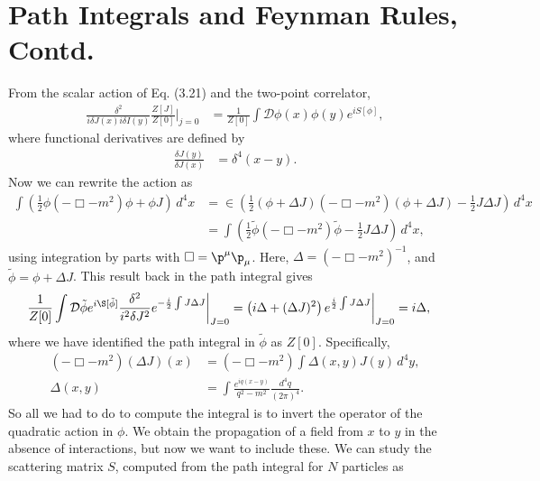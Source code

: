 \documentclass[relqm.tex]{subfiles}
\begin{document}
\chapter{Path Integrals and Feynman Rules, Contd.}
From the scalar action of Eq. (3.21) and the two-point correlator,
\begin{align}
    \frac{\delta^2}{i\delta J(x)i\delta I(y)}\frac{Z[J]}{Z[0]}\bigg|_{j=0} &= \frac{1}{Z[0]}\int \mathcal{D}\phi(x)\phi(y)e^{iS[\phi]},
\end{align}
where functional derivatives are defined by
\begin{align}
    \frac{\delta J(y)}{\delta J(x)} &= \delta^4(x-y).
\end{align}
Now we can rewrite the action as
\begin{align}
    \int \left(\frac12\phi(-\Box-m^2)\phi+\phi J\right)\,d^4x &= \in \left(\frac12(\phi+\Delta J)(-\Box-m^2)(\phi+\Delta J) - \frac12 J\Delta J\right)\,d^4x\\
                                                              &= \int \left(\frac12\tilde{\phi}(-\Box-m^2)\tilde{\phi} - \frac12 J\Delta J\right)\,d^4x,
\end{align}
using integration by parts with $\Box=\p^\mu\p_\mu$.
Here, $\Delta = (-\Box-m^2)^{-1}$, and $\tilde{\phi}=\phi+\Delta J$.
This result back in the path integral gives
\begin{align}
    \frac{1}{Z[0]}\int \mathcal{D}\tilde{\phi}e^{i\S[\tilde{\phi}]}\frac{\delta^2}{i^2\delta J^2}e^{-\frac{i}{2}\int J\Delta J}\bigg|_{J=0} &= \left(i\Delta + (\Delta J)^2\right)e^{\frac{i}{2}\int J\Delta J}\bigg|_{J=0} = i\Delta,
\end{align}
where we have identified the path integral in $\tilde{\phi}$ as $Z[0]$.
Specifically,
\begin{align}
    (-\Box-m^2)(\Delta J)(x) &= (-\Box-m^2)\int \Delta(x,y)J(y)\,d^4y, \\
    \Delta(x,y) &= \int \frac{e^{iq(x-y)}}{q^2-m^2}\frac{d^4q}{(2\pi)^4}.
\end{align}
So all we had to do to compute the integral is to invert the operator of the quadratic action in $\phi$.
We obtain the propagation of a field from $x$ to $y$ in the absence of interactions, but now we want to include these. 
We can study the scattering matrix $S$, computed from the path integral for $N$ particles as
\end{document}

